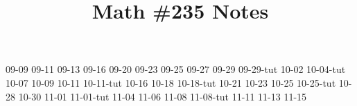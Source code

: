 \documentclass{scrartcl}
\title{Math \#235 Notes}
\begin{document}
\maketitle

\clearpage
\tableofcontents



{09-09}
{09-11}
{09-13}
{09-16}
{09-20}
{09-23}
{09-25}
{09-27}
{09-29}
{09-29-tut}
{10-02}
{10-04-tut}
{10-07}
{10-09}
{10-11}
{10-11-tut}
{10-16}
{10-18}
{10-18-tut}
{10-21}
{10-23}
{10-25}
{10-25-tut}
{10-28}
{10-30}
{11-01}
{11-01-tut}
{11-04}
{11-06}
{11-08}
{11-08-tut}
{11-11}
{11-13}
{11-15}

\end{document}
